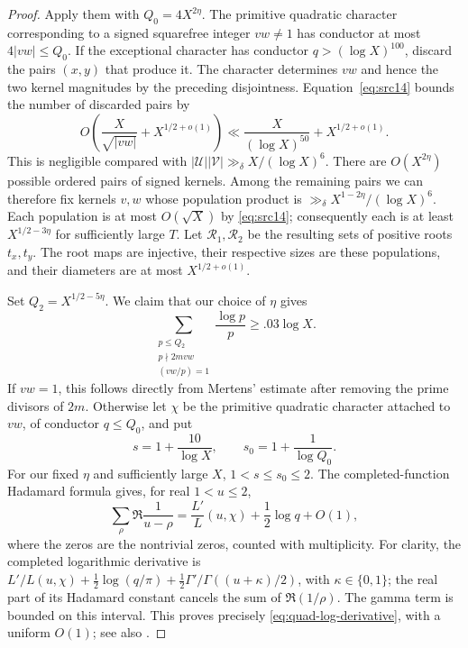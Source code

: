 \begin{proof}
Apply them with $Q_0=4X^{2\eta}$.
The primitive quadratic character corresponding to a signed
squarefree integer $vw\ne1$ has conductor at most $4|vw|\leq Q_0$.
If the exceptional character has conductor
$q>(\log X)^{100}$, discard the pairs $(x,y)$ that produce it.
The character determines $vw$ and hence the two kernel magnitudes
by the preceding disjointness.  Equation~\eqref{eq:src14} bounds
the number of discarded pairs by
\[
 O\left(\frac X{\sqrt{|vw|}}+X^{1/2+o(1)}\right)
 \ll\frac X{(\log X)^{50}}+X^{1/2+o(1)}.
\]
This is negligible compared with
$|\mathcal U||\mathcal V|\gg_\delta X/(\log X)^6$.
There are $O(X^{2\eta})$ possible ordered pairs of signed kernels.
Among the remaining pairs we can therefore fix kernels $v,w$ whose
population product is
$\gg_\delta X^{1-2\eta}/(\log X)^6$.
Each population is at most $O(\sqrt X)$ by
\eqref{eq:src14}; consequently each is at least
$X^{1/2-3\eta}$ for sufficiently large $T$.
Let $\mathcal R_1,\mathcal R_2$ be the resulting sets of positive
roots $t_x,t_y$.  The root maps are injective, their respective sizes
are these populations, and their diameters are at most
$X^{1/2+o(1)}$.

Set $Q_2=X^{1/2-5\eta}$.  We claim that our choice of $\eta$ gives
\begin{equation}\label{eq:src15}
 \sum_{\substack{p\leq Q_2\\p\nmid2mvw\\(vw/p)=1}}
                  \frac{\log p}{p}\geq .03\log X.
\end{equation}
If $vw=1$, this follows directly from Mertens' estimate after
removing the prime divisors of $2m$.
Otherwise let $\chi$ be the primitive quadratic character attached
to $vw$, of conductor $q\leq Q_0$, and put
\[
 s=1+\frac{10}{\log X},\qquad s_0=1+\frac1{\log Q_0}.
\]
For our fixed $\eta$ and sufficiently large $X$,
$1<s\leq s_0\leq2$.
The completed-function Hadamard formula gives, for real $1<u\leq2$,
\begin{equation}\label{eq:quad-log-derivative}
 \sum_\rho\Re\frac1{u-\rho}
       =\frac{L'}L(u,\chi)+\frac12\log q+O(1),
\end{equation}
where the zeros are the nontrivial zeros, counted with multiplicity.
For clarity, the completed logarithmic derivative is
$L'/L(u,\chi)+\tfrac12\log(q/\pi)
+\tfrac12\Gamma'/\Gamma((u+\kappa)/2)$, with
$\kappa\in\{0,1\}$; the real part of its Hadamard constant cancels
the sum of $\Re(1/\rho)$.  The gamma term is bounded on this
interval.  This proves precisely \eqref{eq:quad-log-derivative},
with a uniform $O(1)$; see also
\cite[Section~3.7.4, Equations (3.97)--(3.102)]{Helfgott}.


\end{proof}
